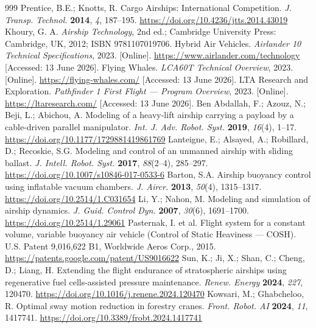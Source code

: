 \documentclass[applsci,article,submit,pdftex,moreauthors]{Definitions/mdpi}
\begin{document}
\begin{thebibliography}{999}
 Prentice, B.E.; Knotts, R. Cargo Airships: International Competition. \textit{J. Transp. Technol.} \textbf{2014}, \textit{4}, 187--195. \url{https://doi.org/10.4236/jtts.2014.43019}
 Khoury, G. A. \textit{Airship Technology}, 2nd ed.; Cambridge University Press: Cambridge, UK, 2012; ISBN 9781107019706.
 Hybrid Air Vehicles. \textit{Airlander 10 Technical Specifications}, 2023. [Online]. \url{https://www.airlander.com/technology} [Accessed: 13 June 2026].
 Flying Whales. \textit{LCA60T Technical Overview}, 2023. [Online]. \url{https://flying-whales.com/} [Accessed: 13 June 2026].
 LTA Research and Exploration. \textit{Pathfinder 1 First Flight --- Program Overview}, 2023. [Online]. \url{https://ltaresearch.com/} [Accessed: 13 June 2026].
 Ben Abdallah, F.; Azouz, N.; Beji, L.; Abichou, A. Modeling of a heavy-lift airship carrying a payload by a cable-driven parallel manipulator. \textit{Int. J. Adv. Robot. Syst.} \textbf{2019}, \textit{16}(4), 1--17. \url{https://doi.org/10.1177/1729881419861769}
 Lanteigne, E.; Alsayed, A.; Robillard, D.; Recoskie, S.G. Modeling and control of an unmanned airship with sliding ballast. \textit{J. Intell. Robot. Syst.} \textbf{2017}, \textit{88}(2--4), 285--297. \url{https://doi.org/10.1007/s10846-017-0533-6}
 Barton, S.A. Airship buoyancy control using inflatable vacuum chambers. \textit{J. Aircr.} \textbf{2013}, \textit{50}(4), 1315--1317. \url{https://doi.org/10.2514/1.C031654}
 Li, Y.; Nahon, M. Modeling and simulation of airship dynamics. \textit{J. Guid. Control Dyn.} \textbf{2007}, \textit{30}(6), 1691--1700. \url{https://doi.org/10.2514/1.29061}
 Pasternak, I. et al. Flight system for a constant volume, variable buoyancy air vehicle (Control of Static Heaviness --- COSH). U.S. Patent 9,016,622 B1, Worldwide Aeros Corp., 2015. \url{https://patents.google.com/patent/US9016622}
 Sun, K.; Ji, X.; Shan, C.; Cheng, D.; Liang, H. Extending the flight endurance of stratospheric airships using regenerative fuel cells-assisted pressure maintenance. \textit{Renew. Energy} \textbf{2024}, \textit{227}, 120470. \url{https://doi.org/10.1016/j.renene.2024.120470}
 Kowsari, M.; Ghabcheloo, R. Optimal sway motion reduction in forestry cranes. \textit{Front. Robot. AI} \textbf{2024}, \textit{11}, 1417741. \url{https://doi.org/10.3389/frobt.2024.1417741}

\end{thebibliography}
\end{document}
